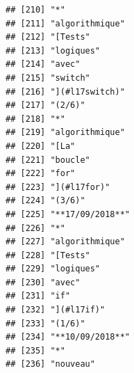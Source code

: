 \documentclass[]{book}
\begin{document}
\begin{verbatim}
## [210] "*"                                                                                      
## [211] "algorithmique"                                                                          
## [212] "[Tests"                                                                                 
## [213] "logiques"                                                                               
## [214] "avec"                                                                                   
## [215] "switch"                                                                                 
## [216] "](#l17switch)"                                                                          
## [217] "(2/6)"                                                                                  
## [218] "*"                                                                                      
## [219] "algorithmique"                                                                          
## [220] "[La"                                                                                    
## [221] "boucle"                                                                                 
## [222] "for"                                                                                    
## [223] "](#l17for)"                                                                             
## [224] "(3/6)"                                                                                  
## [225] "**17/09/2018**"                                                                         
## [226] "*"                                                                                      
## [227] "algorithmique"                                                                          
## [228] "[Tests"                                                                                 
## [229] "logiques"                                                                               
## [230] "avec"                                                                                   
## [231] "if"                                                                                     
## [232] "](#l17if)"                                                                              
## [233] "(1/6)"                                                                                  
## [234] "**10/09/2018**"                                                                         
## [235] "*"                                                                                      
## [236] "nouveau"                                                                                

\end{verbatim}
\end{document}
